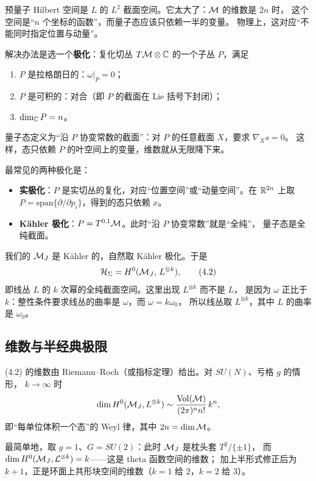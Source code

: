 预量子 Hilbert 空间是 $L$ 的 $L^2$ 截面空间。它太大了：$\mathcal{M}$ 的维数是 $2n$ 时，
这个空间是“$n$ 个坐标的函数”，而量子态应该只依赖一半的变量。
物理上，这对应“不能同时指定位置与动量”。

解决办法是选一个\textbf{极化}：复化切丛 $T\mathcal{M}\otimes\mathbb{C}$ 的一个子丛 $P$，满足
\begin{enumerate}[leftmargin=*]
  \item $P$ 是拉格朗日的：$\omega|_P=0$；
  \item $P$ 是可积的：对合（即 $P$ 的截面在 Lie 括号下封闭）；
  \item $\dim_{\mathbb{C}} P=n$。
\end{enumerate}
量子态定义为“沿 $P$ 协变常数的截面”：对 $P$ 的任意截面 $X$，要求 $\nabla_Xs=0$。
这样，态只依赖 $P$ 的叶空间上的变量，维数就从无限降下来。

最常见的两种极化是：
\begin{itemize}[leftmargin=*]
  \item \textbf{实极化}：$P$ 是实切丛的复化，对应“位置空间”或“动量空间”。在 $\mathbb{R}^{2n}$ 上取
        $P=\mathrm{span}\{\partial/\partial p_i\}$，得到的态只依赖 $x$。
  \item \textbf{Kähler 极化}：$P=T^{0,1}\mathcal{M}$。此时“沿 $P$ 协变常数”就是“全纯”，
        量子态是全纯截面。
\end{itemize}
我们的 $\mathcal{M}_J$ 是 Kähler 的，自然取 Kähler 极化。于是
\begin{equation}
\mathcal{H}_\Sigma=H^0(\mathcal{M}_J,\,L^{\otimes k}), \tag{4.2}
\end{equation}
即线丛 $L$ 的 $k$ 次幂的全纯截面空间。这里出现 $L^{\otimes k}$ 而不是 $L$，
是因为 $\omega$ 正比于 $k$：整性条件要求线丛的曲率是 $\omega$，而 $\omega=k\omega_0$，
所以线丛取 $L^{\otimes k}$，其中 $L$ 的曲率是 $\omega_0$。

\subsection{维数与半经典极限}

(4.2) 的维数由 Riemann--Roch（或指标定理）给出。对 $SU(N)$、亏格 $g$ 的情形，
$k\to\infty$ 时
\[
\dim H^0(\mathcal{M}_J,L^{\otimes k})\sim \frac{\mathrm{Vol}(\mathcal{M})}{(2\pi)^n n!}\,k^n,
\]
即“每单位体积一个态”的 Weyl 律，其中 $2n=\dim\mathcal{M}$。

最简单地，取 $g=1$、$G=SU(2)$：此时 $\mathcal{M}_J$ 是枕头套 $T^2/\{\pm1\}$，
而 $\dim H^0(\mathcal{M}_J,\mathcal{L}^{\otimes k})=k$——这是 theta 函数空间的维数；
加上半形式修正后为 $k+1$，正是环面上共形块空间的维数（$k=1$ 给 $2$，$k=2$ 给 $3$）。

